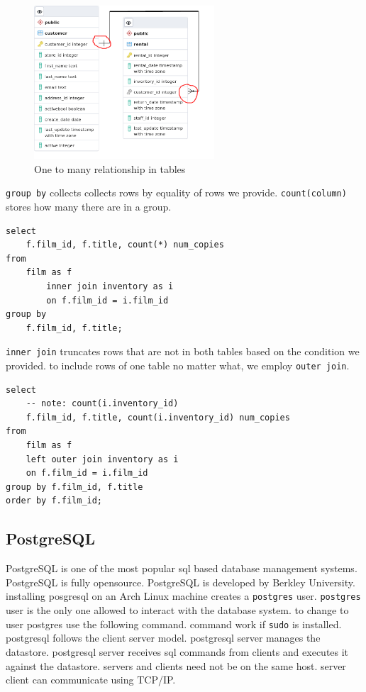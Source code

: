\documentclass[a4paper]{article}
\begin{document}
\begin{figure}
    \centering
    \includegraphics[width=0.6\textwidth]{graphics/one-to-many-relationship.jpg}
    \caption{One to many relationship in tables}
\end{figure}

\lstinline{group by} collects collects rows by equality of rows we provide. \lstinline{count(column)} stores how many there are in a 
group.

\begin{lstlisting}
select
    f.film_id, f.title, count(*) num_copies
from
    film as f 
        inner join inventory as i 
        on f.film_id = i.film_id
group by
    f.film_id, f.title;
\end{lstlisting}

\lstinline{inner join} truncates rows that are not in both tables based on the condition we provided. to include rows of one table
no matter what, we employ \lstinline{outer join}.

\begin{lstlisting}
select
    -- note: count(i.inventory_id)
    f.film_id, f.title, count(i.inventory_id) num_copies
from
    film as f
    left outer join inventory as i 
    on f.film_id = i.film_id
group by f.film_id, f.title
order by f.film_id;
\end{lstlisting}

\subsection*{PostgreSQL}
\lstset{style=custom-bash}
PostgreSQL is one of the most popular sql based database management systems. PostgreSQL is fully opensource. PostgreSQL is developed 
by Berkley University. installing posgresql on  an Arch Linux machine creates a \lstinline{postgres} user. \lstinline{postgres} user 
is the only one allowed to interact with the database system. to change to user postgres use the following command. command work 
if \lstinline{sudo} is installed. postgresql follows the client server model. postgresql server manages the datastore. postgresql 
server receives sql commands from clients and executes it against the datastore. servers and clients need not be on the same host.
server client can communicate using TCP/IP.
\end{document}

